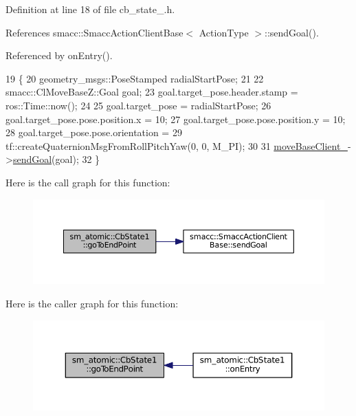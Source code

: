 Definition at line 18 of file cb\+\_\+state\+\_.\+h.



References smacc\+::\+Smacc\+Action\+Client\+Base$<$ Action\+Type $>$\+::send\+Goal().



Referenced by on\+Entry().


\begin{DoxyCode}
19     \{
20         geometry\_msgs::PoseStamped radialStartPose;
21 
22         smacc::ClMoveBaseZ::Goal goal;
23         goal.target\_pose.header.stamp = ros::Time::now();
24 
25         goal.target\_pose = radialStartPose;
26         goal.target\_pose.pose.position.x = 10;
27         goal.target\_pose.pose.position.y = 10;
28         goal.target\_pose.pose.orientation =
29             tf::createQuaternionMsgFromRollPitchYaw(0, 0, M\_PI);
30 
31         \hyperlink{structsm__atomic_1_1CbState1_a8b4b01655654c03cd1f01ad7cf3feb02}{moveBaseClient\_}->\hyperlink{classsmacc_1_1SmaccActionClientBase_a58c67a87c5fb8ea1633573c58fe3eee1}{sendGoal}(goal);
32     \}
\end{DoxyCode}


Here is the call graph for this function\+:
\nopagebreak
\begin{figure}[H]
\begin{center}
\leavevmode
\includegraphics[width=350pt]{structsm__atomic_1_1CbState1_ae27f060a983c1128d3c928eed45eae6b_cgraph}
\end{center}
\end{figure}




Here is the caller graph for this function\+:
\nopagebreak
\begin{figure}[H]
\begin{center}
\leavevmode
\includegraphics[width=350pt]{structsm__atomic_1_1CbState1_ae27f060a983c1128d3c928eed45eae6b_icgraph}
\end{center}
\end{figure}


